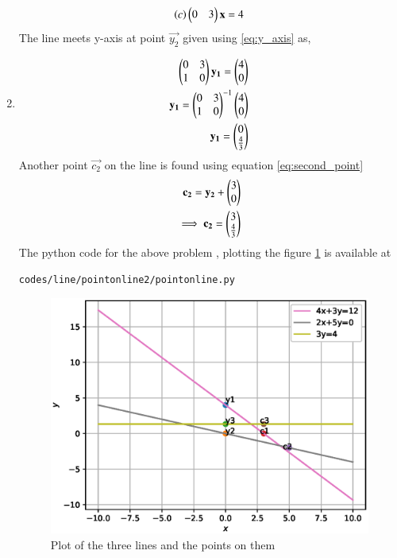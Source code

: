 \begin{enumerate}[label=\thesection.\arabic*.,ref=\thesection.\theenumi]
\begin{align}
\left(c\right)\begin{pmatrix}0&3\end{pmatrix}\mathbf{x}=4
\end{align}
The line meets y-axis at point $\vec{y_2}$ given using \ref{eq:y_axis} as,
\item 
\begin{align}
\begin{pmatrix}0&3\\1&0\end{pmatrix}\mathbf{y_1} =\begin{pmatrix}4\\0\end{pmatrix}
\\
\mathbf{y_1}={\begin{pmatrix}0&3\\1&0\end{pmatrix}}^{-1}\begin{pmatrix}4\\0\end{pmatrix}
\\
\mathbf{y_1}=\begin{pmatrix}0\\\frac{4}{3}\end{pmatrix}
\end{align}
Another point $\vec{c_2}$ on the line is found using equation \ref{eq:second_point}
\begin{align}
\mathbf{c_2} = \mathbf{y_2} + \begin{pmatrix}3\\0\end{pmatrix}
\\
\implies \mathbf{c_2} = \begin{pmatrix}3\\\frac{4}{3}\end{pmatrix}
\end{align}
The python code for the above problem , plotting the figure \ref{fig:three_lines} is available at 
\begin{lstlisting}
codes/line/pointonline2/pointonline.py
\end{lstlisting}
\begin{figure}[!ht]
\centering
\includegraphics[width=\columnwidth]{./codes/line/pointonline2/pyfigs/pointonline.eps}
\caption{Plot of the three lines and the points on them }
\label{fig:three_lines}
\end{figure}

\end{enumerate}
